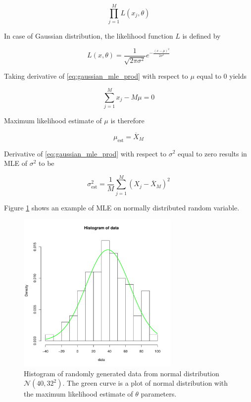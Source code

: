 \documentclass[thesis=B,english]{FITthesis}[2012/06/26]
\begin{document}
\begin{equation} \label{eq:gaussian_mle_prod}
\prod_{j=1}^{M} L(x_j, \theta)
\end{equation}

In case of Gaussian distribution, the likelihood function $L$ is defined by

\begin{equation}
L(x, \theta) = \frac{1}{\sqrt{2 \pi \sigma^2}}e^{-\frac{(x-\mu)^2}{2 \sigma^2}}
\end{equation}

Taking derivative of \ref{eq:gaussian_mle_prod} with respect to $\mu$ equal to 0 yields

\begin{equation}
\sum_{j=1}^{M}{x_j - M \mu} = 0
\end{equation}

Maximum likelihood estimate of $\mu$ is therefore

\begin{equation}
\mu_{\text{est}} = \overline X_M
\end{equation}

Derivative of \ref{eq:gaussian_mle_prod} with respect to $\sigma^2$ equal to zero results in MLE of $\sigma^2$ to be

\begin{equation}
\sigma^2_{\text{est}} = \frac{1}{M} \sum_{j=1}^{M} {(X_j-\overline X_M)^2}
\end{equation}

Figure \ref{fig:normal_mle} shows an example of MLE on normally distributed random variable.

\begin{figure}
	\centering
 	\includegraphics[width=0.7\textwidth]{normal_mle}
 	\caption{Histogram of randomly generated data from normal distribution $\mathcal{N}(40,32^2)$. The green curve is a plot of normal distribution with the maximum likelihood estimate of $\theta$ parameters.}
 	\label{fig:normal_mle}
\end{figure}
\end{document}
